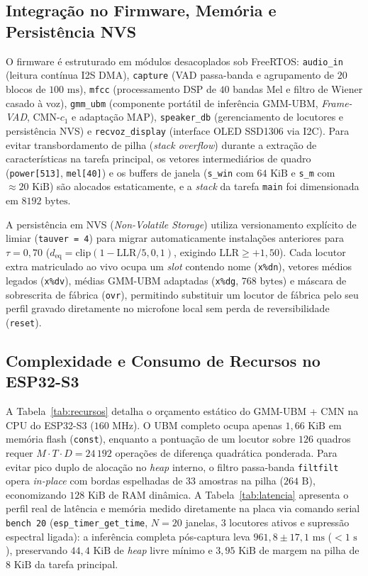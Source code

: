 \documentclass[9pt,technote,a4paper]{IEEEtran}
\begin{document}
\subsection{Integração no Firmware, Memória e Persistência NVS}
O firmware é estruturado em módulos desacoplados sob FreeRTOS: \texttt{audio\_in} (leitura contínua I2S DMA), \texttt{capture} (VAD passa-banda e agrupamento de $20$ blocos de $100\text{ ms}$), \texttt{mfcc} (processamento DSP de $40$ bandas Mel e filtro de Wiener casado à voz), \texttt{gmm\_ubm} (componente portátil de inferência GMM-UBM, \textit{Frame-VAD}, CMN-$c_1$ e adaptação MAP), \texttt{speaker\_db} (gerenciamento de locutores e persistência NVS) e \texttt{recvoz\_display} (interface OLED SSD1306 via I2C). Para evitar transbordamento de pilha (\textit{stack overflow}) durante a extração de características na tarefa principal, os vetores intermediários de quadro (\texttt{power[513]}, \texttt{mel[40]}) e os buffers de janela (\texttt{s\_win} com $64\text{ KiB}$ e \texttt{s\_m} com $\approx 20\text{ KiB}$) são alocados estaticamente, e a \textit{stack} da tarefa \texttt{main} foi dimensionada em $8192\text{ bytes}$.

A persistência em NVS (\textit{Non-Volatile Storage}) utiliza versionamento explícito de limiar (\texttt{tauver = 4}) para migrar automaticamente instalações anteriores para $\tau = 0{,}70$ ($d_{\mathrm{eq}} = \mathrm{clip}(1 - \mathrm{LLR}/5, 0, 1)$, exigindo $\mathrm{LLR} \ge +1{,}50$). Cada locutor extra matriculado ao vivo ocupa um \textit{slot} contendo nome (\texttt{x\%dn}), vetores médios legados (\texttt{x\%dv}), médias GMM-UBM adaptadas (\texttt{x\%dg}, $768\text{ bytes}$) e máscara de sobrescrita de fábrica (\texttt{ovr}), permitindo substituir um locutor de fábrica pelo seu perfil gravado diretamente no microfone local sem perda de reversibilidade (\texttt{reset}).

\subsection{Complexidade e Consumo de Recursos no ESP32-S3}
A Tabela~\ref{tab:recursos} detalha o orçamento estático do GMM-UBM + CMN na CPU do ESP32-S3 ($160\text{ MHz}$). O UBM completo ocupa apenas $1{,}66\text{ KiB}$ em memória flash (\texttt{const}), enquanto a pontuação de um locutor sobre $126$ quadros requer $M \cdot T \cdot D = 24\,192$ operações de diferença quadrática ponderada. Para evitar pico duplo de alocação no \textit{heap} interno, o filtro passa-banda \texttt{filtfilt} opera \textit{in-place} com bordas espelhadas de $33$ amostras na pilha ($264\text{ B}$), economizando $128\text{ KiB}$ de RAM dinâmica. A Tabela~\ref{tab:latencia} apresenta o perfil real de latência e memória medido diretamente na placa via comando serial \texttt{bench 20} (\texttt{esp\_timer\_get\_time}, $N=20$ janelas, $3$ locutores ativos e supressão espectral ligada): a inferência completa pós-captura leva $961{,}8 \pm 17{,}1\text{ ms}$ ($< 1\text{ s}$), preservando $44{,}4\text{ KiB}$ de \textit{heap} livre mínimo e $3{,}95\text{ KiB}$ de margem na pilha de $8\text{ KiB}$ da tarefa principal.
\end{document}
